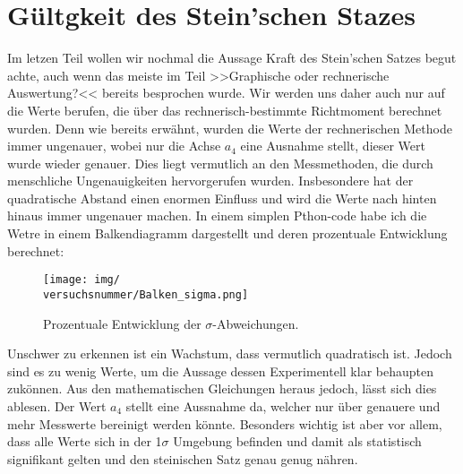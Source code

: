 \section{Gültgkeit des Stein'schen Stazes}
Im letzen Teil wollen wir nochmal die Aussage Kraft des Stein'schen Satzes begut achte, auch wenn das meiste im Teil >>Graphische oder rechnerische Auswertung?<< bereits besprochen wurde. 
Wir werden uns daher auch nur auf die Werte berufen, die über das rechnerisch-bestimmte Richtmoment berechnet wurden. 
Denn wie bereits erwähnt, wurden die Werte der rechnerischen Methode immer ungenauer, wobei nur die Achse $a_4$ eine Ausnahme stellt, dieser Wert wurde wieder genauer. Dies liegt vermutlich an den Messmethoden, die durch menschliche Ungenauigkeiten hervorgerufen wurden.
Insbesondere hat der quadratische Abstand einen enormen Einfluss und wird die Werte nach hinten hinaus immer ungenauer machen. 
In einem simplen Pthon-code habe ich die Wetre in einem Balkendiagramm dargestellt und deren prozentuale Entwicklung berechnet:
\begin{figure}[h!]
    \texttt{[image: img/\\versuchsnummer/Balken\_sigma.png]}
    \caption{Prozentuale Entwicklung der $\sigma$-Abweichungen.}
    \label{img:balken_sigma}
\end{figure}

Unschwer zu erkennen ist ein Wachstum, dass vermutlich quadratisch ist. Jedoch sind es zu wenig Werte, um die Aussage dessen Experimentell klar behaupten zukönnen. Aus den mathematischen Gleichungen heraus jedoch, lässt sich dies ablesen.
Der Wert $a_4$ stellt eine Aussnahme da, welcher nur über genauere und mehr Messwerte bereinigt werden könnte. 
Besonders wichtig ist aber vor allem, dass alle Werte sich in der 1$\sigma$ Umgebung befinden und damit als statistisch signifikant gelten und den steinischen Satz genau genug nähren.
